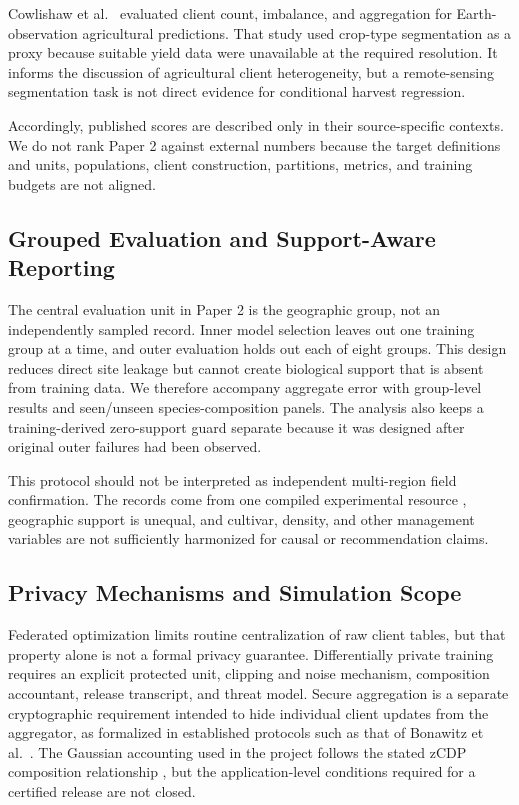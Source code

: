 \documentclass[journal]{IEEEtran}
\begin{document}
Cowlishaw et al.\ \cite{cowlishaw2025balancing} evaluated client count,
imbalance, and aggregation for Earth-observation agricultural predictions. That
study used crop-type segmentation as a proxy because suitable yield data were
unavailable at the required resolution. It informs the discussion of
agricultural client heterogeneity, but a remote-sensing segmentation task is not
direct evidence for conditional harvest regression.

Accordingly, published scores are described only in their source-specific
contexts. We do not rank Paper 2 against external numbers because the target
definitions and units, populations, client construction, partitions, metrics,
and training budgets are not aligned.

\subsection{Grouped Evaluation and Support-Aware Reporting}

The central evaluation unit in Paper 2 is the geographic group, not an
independently sampled record. Inner model selection leaves out one training
group at a time, and outer evaluation holds out each of eight groups. This
design reduces direct site leakage but cannot create biological support that is
absent from training data. We therefore accompany aggregate error with
group-level results and seen/unseen species-composition panels. The analysis
also keeps a training-derived zero-support guard separate because it was
designed after original outer failures had been observed.

This protocol should not be interpreted as independent multi-region field
confirmation. The records come from one compiled experimental resource
\cite{gaudio2024cereallegume}, geographic support is unequal, and cultivar,
density, and other management variables are not sufficiently harmonized for
causal or recommendation claims.

\subsection{Privacy Mechanisms and Simulation Scope}

Federated optimization limits routine centralization of raw client tables, but
that property alone is not a formal privacy guarantee. Differentially private
training requires an explicit protected unit, clipping and noise mechanism,
composition accountant, release transcript, and threat model. Secure aggregation
is a separate cryptographic requirement intended to hide individual client
updates from the aggregator, as formalized in established protocols such as that
of Bonawitz et al.\ \cite{bonawitz2017secure}. The Gaussian accounting used in
the project follows the stated zCDP composition relationship
\cite{bun2016concentrated}, but the application-level conditions required for a
certified release are not closed.
\end{document}
